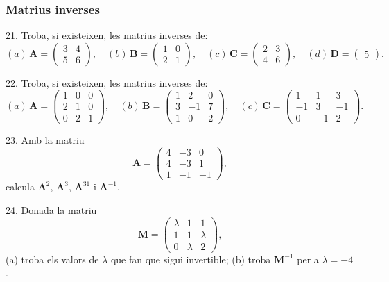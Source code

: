 \documentclass[12pt]{article}
\newcommand{\mat}[1]{\mathbf{#1}}
\begin{document}
\subsubsection{Matrius inverses}
\begin{exercici}
21. Troba, si existeixen, les matrius inverses de:
\[
(a) \, \mat{A} = \begin{pmatrix} 3 & 4 \\ 5 & 6 \end{pmatrix}, \quad 
(b) \, \mat{B} = \begin{pmatrix} 1 & 0 \\ 2 & 1 \end{pmatrix}, \quad 
(c) \, \mat{C} = \begin{pmatrix} 2 & 3 \\ 4 & 6 \end{pmatrix}, \quad 
(d) \, \mat{D} = \begin{pmatrix} 5 \end{pmatrix}.
\]
\end{exercici}

\begin{exercici}
22. Troba, si existeixen, les matrius inverses de:
\[
(a) \, \mat{A} = 
\begin{pmatrix}
1 & 0 & 0 \\
2 & 1 & 0 \\
0 & 2 & 1
\end{pmatrix}, \quad 
(b) \, \mat{B} = 
\begin{pmatrix}
1 & 2 & 0 \\
3 & -1 & 7 \\
1 & 0 & 2
\end{pmatrix}, \quad 
(c) \, \mat{C} = 
\begin{pmatrix}
1 & 1 & 3 \\
-1 & 3 & -1 \\
0 & -1 & 2
\end{pmatrix}.
\]
\end{exercici}

\begin{exercici}
23. Amb la matriu 
\[
\mat{A} = 
\begin{pmatrix}
4 & -3 & 0 \\
4 & -3 & 1 \\
1 & -1 & -1
\end{pmatrix},
\]
calcula $\mat{A}^2$, $\mat{A}^3$, $\mat{A}^{31}$ i $\mat{A}^{-1}$.
\end{exercici}

\begin{exercici}
24. Donada la matriu 
\[
\mat{M} = 
\begin{pmatrix}
\lambda & 1 & 1 \\
1 & 1 & \lambda \\
0 & \lambda & 2
\end{pmatrix},
\]
(a) troba els valors de $\lambda$ que fan que sigui invertible;  
(b) troba $\mat{M}^{-1}$ per a $\lambda = -4$.
\end{exercici}
\end{document}
